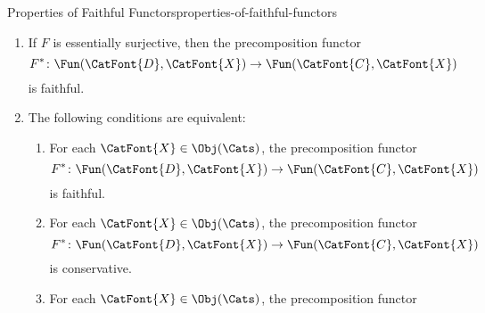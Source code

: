 \begin{proposition}{Properties of Faithful Functors}{properties-of-faithful-functors}
\begin{enumerate}
\begin{enumerate}
\[                        \Fun(\CatFont{C},\CatFont{X})
                    \]%
                     to be faithful.
                \item\label{properties-of-faithful-functors-interaction-with-precomposition-1-b}Conversely, if the precomposition functor
                    \[
                        F^{*}
                        \colon
                        \Fun(\CatFont{D},\CatFont{X})
                        \to
                        \Fun(\CatFont{C},\CatFont{X})
                    \]%
                    is faithful, then $F$  to be faithful.
            \end{enumerate}
        \item\label{properties-of-faithful-functors-interaction-with-precomposition-2}If $F$ is essentially surjective, then the precomposition functor
            \[
                F^{*}
                \colon
                \Fun(\CatFont{D},\CatFont{X})
                \to
                \Fun(\CatFont{C},\CatFont{X})
            \]%
            is faithful.
        \item\label{properties-of-faithful-functors-interaction-with-precomposition-3}The following conditions are equivalent:
            \begin{enumerate}
                \item\label{properties-of-faithful-functors-interaction-with-precomposition-3-a}For each $\CatFont{X}\in\Obj(\Cats)$, the precomposition functor
                    \[
                        F^{*}
                        \colon
                        \Fun(\CatFont{D},\CatFont{X})
                        \to
                        \Fun(\CatFont{C},\CatFont{X})
                    \]%
                    is faithful.
                \item\label{properties-of-faithful-functors-interaction-with-precomposition-3-b}For each $\CatFont{X}\in\Obj(\Cats)$, the precomposition functor
                    \[
                        F^{*}
                        \colon
                        \Fun(\CatFont{D},\CatFont{X})
                        \to
                        \Fun(\CatFont{C},\CatFont{X})
                    \]%
                    is conservative.
                \item\label{properties-of-faithful-functors-interaction-with-precomposition-3-c}For each $\CatFont{X}\in\Obj(\Cats)$, the precomposition functor

\end{enumerate}
\end{enumerate}
\end{proposition}
